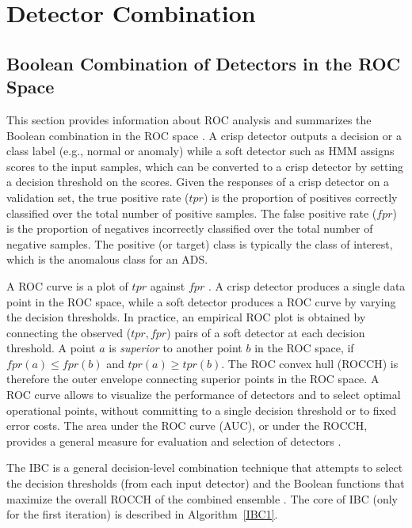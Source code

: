 \chapter{Detector Combination} \label{chapter2}




 \section{Boolean Combination of Detectors in the ROC Space}
\label{sec:boolean-combination}

This section provides information about ROC analysis and summarizes the Boolean combination in the ROC space \cite{Khreich2010-ICPR}.
A crisp detector outputs a decision or a class label (e.g., normal or anomaly) while a soft detector such as HMM assigns scores to the input samples, which can be converted to a crisp detector by setting a decision threshold on the scores.
Given the responses of a crisp detector on a validation set, the true positive rate ($tpr$) is the proportion of positives correctly classified over the total number of positive samples.
The false positive rate ($fpr$) is the proportion of negatives incorrectly classified over the total number of negative samples.
The positive (or target) class is typically the class of interest, which is the anomalous class for an ADS.

A ROC curve is a plot of $tpr$ against $fpr$ \cite{Fawcett2006}.
A crisp detector produces a single data point in the ROC space, while a soft detector produces a ROC curve by varying the decision thresholds.
In practice, an empirical ROC plot is obtained by connecting the observed ($tpr,fpr$) pairs of a soft detector at each decision threshold.
A point $a$ is \textit{superior} to another point $b$ in the ROC space, if $fpr(a) \leq fpr(b)$ and $tpr(a) \geq tpr(b)$.
The ROC convex hull (ROCCH) is therefore the outer envelope connecting superior points in the ROC space.
A ROC curve allows to visualize the performance of detectors and to select optimal operational points, without committing to a single decision threshold or to fixed error costs.
The area under the ROC curve (AUC), or under the ROCCH, provides a general measure for evaluation and selection of detectors \cite{Fawcett2006}.

The IBC is a general decision-level combination technique that attempts to select the decision thresholds (from each input detector) and the Boolean functions that maximize the overall ROCCH of the combined ensemble \cite{Khreich2010-ICPR}.
The core of IBC (only for the first iteration) is described in Algorithm~\ref{IBC1}.


